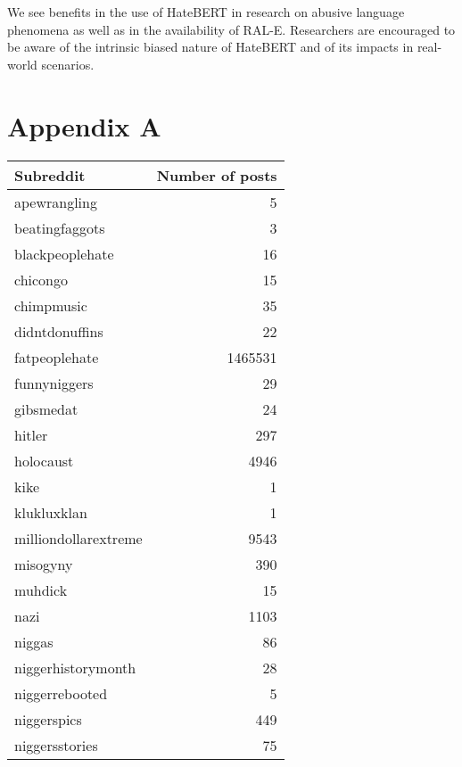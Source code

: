 \documentclass[11pt]{article}
\begin{document}
We see benefits in the use of HateBERT in research on abusive language  phenomena as well as in the availability of RAL-E. Researchers are encouraged to be aware of the intrinsic biased nature of HateBERT and of its impacts in real-world scenarios.

\newpage




\newpage

\section*{Appendix A}
\captionsetup{labelformat=AppendixTables}
\setcounter{table}{0}

\begin{table}[!tbh]
    \centering
\begin{tabular}{lr}
\toprule
    \bf Subreddit & \bf Number of posts  \\ \midrule
apewrangling & 5 \\
beatingfaggots    &  3 \\
blackpeoplehate     &         16 \\
chicongo             &        15 \\
chimpmusic            &       35 \\
didntdonuffins        &       22 \\
fatpeoplehate     &      1465531 \\
funnyniggers       &          29 \\
gibsmedat          &          24 \\
hitler             &         297 \\
holocaust          &        4946 \\
kike               &           1 \\
klukluxklan        &           1 \\
milliondollarextreme   &    9543 \\
misogyny    &                390 \\
muhdick      &                15 \\
nazi         &              1103 \\
niggas        &               86 \\
niggerhistorymonth      &     28 \\
niggerrebooted          &      5 \\
niggerspics             &    449 \\
niggersstories          &     75 \\

\end{tabular}
\end{table}
\end{document}
